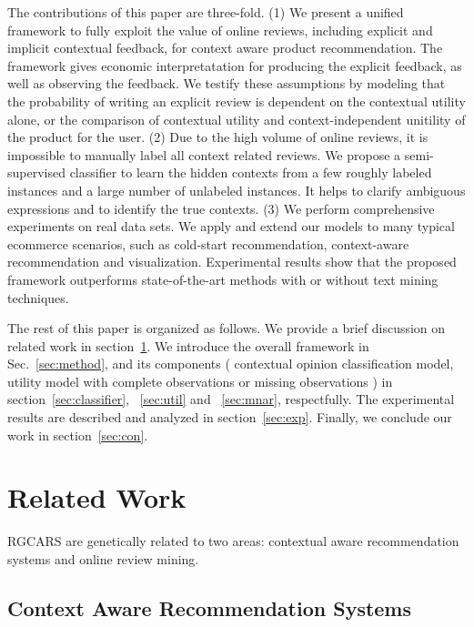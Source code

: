 \documentclass[preprint,12pt]{elsarticle}
\begin{document}
The contributions of this paper are three-fold. (1) We present a unified framework to fully exploit the value of online reviews, including explicit and implicit contextual feedback, for context aware product recommendation. The framework gives economic interpretatation for producing the explicit feedback, as well as observing the feedback. We testify these assumptions by modeling that the probability of writing an explicit review is dependent on the contextual utility alone, or the comparison of contextual utility and context-independent unitility of the product for the user. (2) Due to the high volume of online reviews, it is impossible to manually label all context related reviews. We propose a semi-supervised classifier to learn the hidden contexts from a few roughly labeled instances and a large number of unlabeled instances. It helps to clarify ambiguous expressions and to identify the true contexts. (3) We perform comprehensive experiments on real data sets. We apply and extend our models to many typical ecommerce scenarios, such as cold-start recommendation, context-aware recommendation and visualization. Experimental results show that the proposed framework outperforms state-of-the-art methods with or without text mining techniques. 

The rest of this paper is organized as follows.  We provide a brief discussion on related work in section~\ref{sec:related}. We introduce the overall framework in Sec.~\ref{sec:method}, and its components ( contextual opinion classification model, utility model with complete observations or missing observations ) in section~\ref{sec:classifier}, ~\ref{sec:util} and ~\ref{sec:mnar}, respectfully. The experimental results are described and analyzed in section~\ref{sec:exp}. Finally, we conclude our work in section~\ref{sec:con}.

\section{Related Work}\label{sec:related}
%
RGCARS are genetically related to two areas: contextual aware recommendation systems and online review mining.

\subsection{Context Aware Recommendation Systems}
\end{document}
